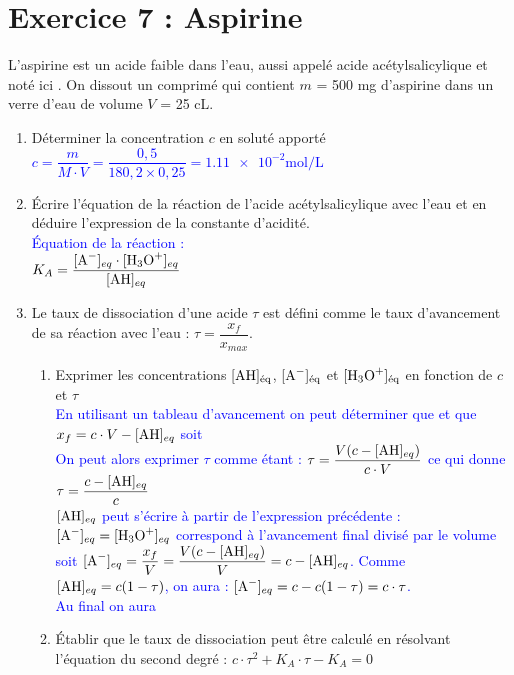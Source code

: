 \documentclass[a4paper,12pt]{article}
\begin{document}
\section*{Exercice 7 : Aspirine}
L'aspirine est un acide faible dans l'eau, aussi appelé acide acétylsalicylique et noté ici . On dissout un comprimé qui contient $m$ = \num{500} \unit{\milli \gram} d'aspirine dans un verre d'eau de volume $V$ = \num{25} \unit{\centi \liter}.
\begin{enumerate}
	\item Déterminer la concentration $c$ en soluté apporté\\
	\textcolor{blue}{$c=\dfrac{m}{M\cdot V} = \dfrac{0,5}{180,2 \times 0,25} = \num{1,11e-2}\unit{\mole\per\liter}$}
	\item Écrire l'équation de la réaction de l'acide acétylsalicylique avec l'eau et en déduire l'expression de la constante d'acidité.\\
	\textcolor{blue}{Équation de la réaction : \\
	$K_A = \dfrac{[\ce{A-}]_{eq} \cdot [\ce{H3O+}]_{eq}}{[\ce{AH}]_{eq}}$}
	\item Le taux de dissociation d'une acide $\tau$ est défini comme le taux d'avancement de sa réaction avec l'eau : $\tau = \dfrac{x_f}{x_{max}}$.
	\begin{enumerate}
		\item Exprimer les concentrations $[\ce{AH}]_{\text{éq}}$, $[\ce{A-}]_{\text{éq}}$ et $[\ce{H3O+}]_{\text{éq}}$ en fonction de $c$ et $\tau$\\
		\textcolor{blue}{En utilisant un tableau d'avancement on peut déterminer que  et que $x_f=c \cdot V - [\ce{AH}]_{eq}$ soit \\
		On peut alors exprimer $\tau$ comme étant : $\tau=\dfrac{V(c-[\ce{AH}]_{eq})}{c \cdot V}$ ce qui donne $\tau=\dfrac{c-[\ce{AH}]_{eq}}{c}$\\
		$[\ce{AH}]_{eq}$ peut s'écrire à partir  de l'expression précédente : \\
		$[\ce{A-}]_{eq} = [\ce{H3O+}]_{eq}$ correspond à l'avancement final divisé par le volume soit $[\ce{A-}]_{eq}=\dfrac{x_f}{V}=\dfrac{V(c-[\ce{AH}]_{eq})}{V}=c-[\ce{AH}]_{eq}$. Comme $[\ce{AH}]_{eq} =c(1-\tau)$, on aura : $[\ce{A-}]_{eq}=c-c(1-\tau) = c\cdot\tau$.\\
		Au final on aura 
		}
		\item Établir que le taux de dissociation peut être calculé en résolvant l'équation du second degré : $c \cdot \tau^2 + K_A \cdot \tau - K_A = 0$\\

\end{enumerate}
\end{enumerate}
\end{document}
